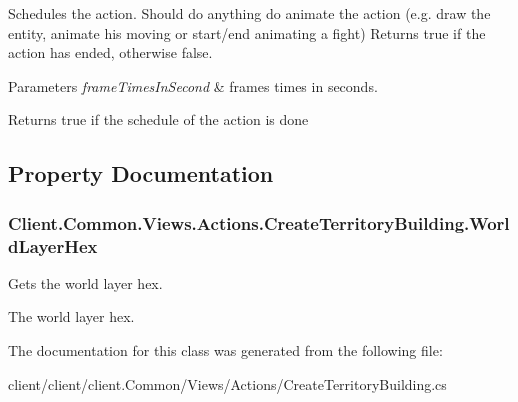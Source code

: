 Schedules the action. Should do anything do animate the action (e.\+g. draw the entity, animate his moving or start/end animating a fight) Returns true if the action has ended, otherwise false. 


\begin{DoxyParams}{Parameters}
{\em frame\+Times\+In\+Second} & frames times in seconds.\\
\hline
\end{DoxyParams}
\begin{DoxyReturn}{Returns}
true if the schedule of the action is done
\end{DoxyReturn}


\subsection{Property Documentation}
\hypertarget{classClient_1_1Common_1_1Views_1_1Actions_1_1CreateTerritoryBuilding_a6e025a3b64f4b7cef83761859c266d57}{}
\subsubsection[{World\+Layer\+Hex}]{ Client.\+Common.\+Views.\+Actions.\+Create\+Territory\+Building.\+World\+Layer\+Hex\hspace{0.3cm}{\ttfamily [get]}}\label{classClient_1_1Common_1_1Views_1_1Actions_1_1CreateTerritoryBuilding_a6e025a3b64f4b7cef83761859c266d57}


Gets the world layer hex. 

The world layer hex.

The documentation for this class was generated from the following file\+:\begin{DoxyCompactItemize}
\item 
client/client/client.\+Common/\+Views/\+Actions/Create\+Territory\+Building.\+cs\end{DoxyCompactItemize}

